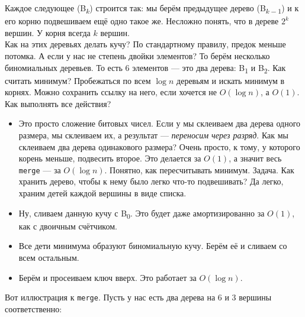 \documentclass{article}
\newcommand{\pseudo}{PseudoLexer.py:PseudoLexer -x}
\newcommand{\pseudocode}[1]{\texttt{#1}}
\begin{document}
    Каждое следующее (B\textsubscript{$k$}) строится так: мы берём предыдущее дерево (B\textsubscript{$k-1$}) и к его корню подвешиваем ещё одно такое же. Несложно понять, что в дереве $2^k$ вершин. У корня всегда $k$ вершин.\\
    Как на этих деревьях делать кучу? По стандартному правилу, предок меньше потомка. А если у нас не степень двойки элементов? То берём несколько биномиальных деревьев. То есть 6 элементов --- это два дерева: B\textsubscript1 и B\textsubscript2. Как считать минимум? Пробежаться по всем $\log n$ деревьям и искать минимум в корнях. Можно сохранить ссылку на него, если хочется не $O(\log n)$, а $O(1)$. Как выполнять все действия?
    \begin{itemize}
        \item[\pseudocode{merge}] Это просто сложение битовых чисел. Если у мы склеиваем два дерева одного размера, мы склеиваем их, а результат --- \textit{переносим через разряд}. Как мы склеиваем два дерева одинакового размера? Очень просто, к тому, у которого корень меньше, подвесить второе. Это делается за $O(1)$, а значит весь \pseudocode{merge} --- за $O(\log n)$. Понятно, как пересчитывать минимум. Задача. Как хранить дерево, чтобы к нему было легко что-то подвешивать? Да легко, храним детей каждой вершины в виде списка.
        \item[\pseudocode{insert}]
        Ну, сливаем данную кучу с B\textsubscript0. Это будет даже амортизированно за $O(1)$, как с двоичным счётчиком. 
        \item[\pseudocode{remove_min}]
        Все дети минимума образуют биномиальную кучу. Берём её и сливаем со всем остальным.
        \item[\pseudocode{decrease_key}]
        Берём и просеиваем ключ вверх. Это работает за $O(\log n)$.
    \end{itemize}
    Вот иллюстрация к \pseudocode{merge}. Пусть у нас есть два дерева на 6 и 3 вершины соответственно:
    \begin{center}
        \hspace{5mm}
    \end{center}
\end{document}
